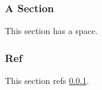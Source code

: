 \documentclass{article}
\begin{document}
\subsubsection{A Section}
\label{sec:with space}
This section has a space.

\subsubsection{Ref}
This section refs \ref{sec:with space}.
\end{document}
